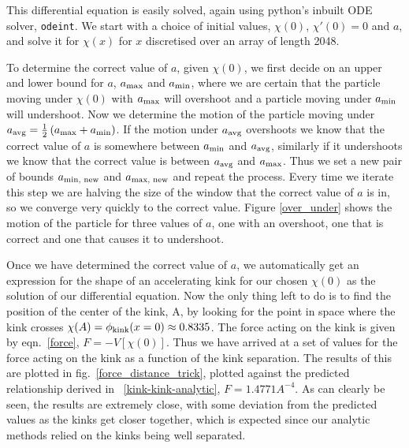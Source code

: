 \documentclass[11pt, oneside,titlepage]{article}  	%
\numberwithin{equation}{section}
\begin{document}
 This differential equation is easily solved, again using python's inbuilt ODE solver, \texttt{odeint}. We start with a choice of initial values, $\chi(0)$, $\chi'(0) = 0$ and $a$, and solve it for $\chi(x)$ for $x$ discretised over an array of length 2048.\par
To determine the correct value of $a$, given $\chi(0)$, we first decide on an upper and lower bound for $a$, $a_\textup{max}$ and $a_\textup{min}$, where we are certain that the particle moving under $\chi(0)$ with $a_\textup{max}$ will overshoot and a particle moving under $a_\textup{min}$ will undershoot. Now we determine the motion of the particle moving under $a_\textup{avg} = \frac{1}{2} \left ( a_\textup{max} + a_\textup{min} \right )$. If the motion under $a_\textup{avg}$ overshoots we know that the correct value of $a$ is somewhere between $a_\textup{min}$ and $a_\textup{avg}$, similarly if it undershoots we know that the correct value is between $a_\textup{avg}$ and $a_\textup{max}$. Thus we set a new pair of bounds $a_\textup{min, new}$ and $a_\textup{max, new}$ and repeat the process. Every time we iterate this step we are halving the size of the window that the correct value of $a$ is in, so we converge very quickly to the correct value. Figure \ref{over_under} shows the motion of the particle for three values of $a$, one with an overshoot, one that is correct and one that causes it to undershoot.\par
Once we have determined the correct value of $a$, we automatically get an expression for the shape of an accelerating kink for our chosen $\chi(0)$ as the solution of our differential equation. Now the only thing left to do is to find the position of the center of the kink, A, by looking for the point in space where the kink crosses $\chi(A) = \phi_\textup{kink}(x=0) \approx 0.8335$. The force acting on the kink is given by eqn.~\ref{force}, $F = -V[\chi(0)]$. Thus we have arrived at a set of values for the force acting on the kink as a function of the kink separation. The results of this are plotted in fig.~\ref{force_distance_trick}, plotted against the predicted relationship derived in \textsection~\ref{kink-kink-analytic}, $F = 1.4771A^{-4}$. As can clearly be seen, the results are extremely close, with some deviation from the predicted values as the kinks get closer together, which is expected since our analytic methods relied on the kinks being well separated.
\end{document}
